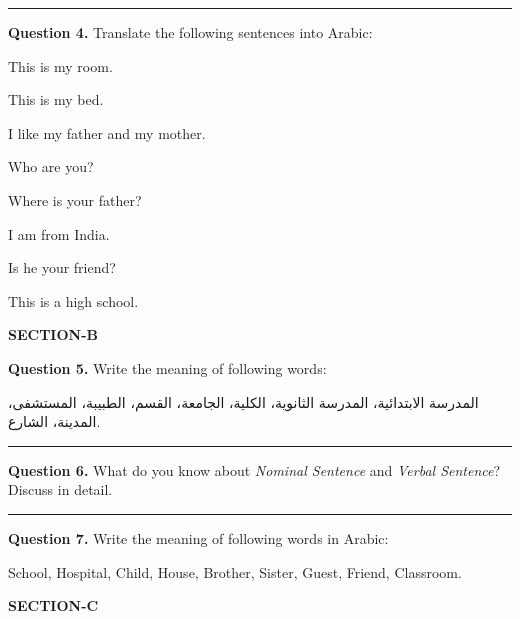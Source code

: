 \documentclass[11pt,a4paper]{article}
\begin{document}
\medskip\rule{\linewidth}{0.2pt}\medskip




\noindent   \textbf{Question 4.} Translate the following sentences into Arabic:

\begin{parts}
  \item This is my room.
  \item This is my bed.
  \item I like my father and my mother.
  \item Who are you?
  \item Where is your father?
  \item I am from India.
  \item Is he your friend?
  \item This is a high school.
\end{parts}

\bigskip


\begin{center}
  {\bfseries\large SECTION-B}
\end{center}




\noindent   \textbf{Question 5.} Write the meaning of following words:

\begin{center}
المدرسة الابتدائية، المدرسة الثانوية، الكلية، الجامعة، القسم، الطبيبة، المستشفى، المدينة، الشارع.
\end{center}

\medskip\rule{\linewidth}{0.2pt}\medskip




\noindent   \textbf{Question 6.} What do you know about   \textit{Nominal Sentence} and   \textit{Verbal Sentence}? Discuss in detail.

\medskip\rule{\linewidth}{0.2pt}\medskip




\noindent   \textbf{Question 7.} Write the meaning of following words in Arabic:

\begin{center}
School, Hospital, Child, House, Brother, Sister, Guest, Friend, Classroom.
\end{center}

\bigskip


\begin{center}
  {\bfseries\large SECTION-C}
\end{center}
\end{document}
